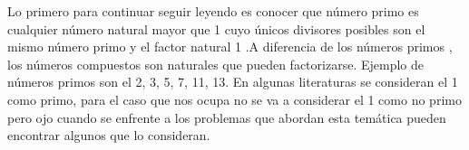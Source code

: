 Lo primero para continuar seguir leyendo es conocer que número primo es cualquier número natural mayor que 1 cuyo únicos divisores posibles son el mismo número primo y el factor natural 1 .A diferencia de los números primos , los números compuestos son naturales que pueden factorizarse. Ejemplo de números primos son el 2, 3, 5, 7, 11, 13. En algunas literaturas se consideran el 1 como primo, para el caso que nos ocupa no se va a considerar el 1 como no primo pero ojo cuando se enfrente a los problemas que abordan esta temática pueden encontrar algunos que lo consideran.